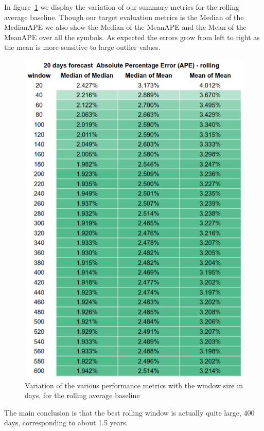 \documentclass[10pt]{article}
\begin{document}
In figure~{\ref{920430}} we display the variation of
our summary metrics for the rolling average baseline. Though our target
evaluation metrics is the Median of the MedianAPE we also show the
Median of the MeanAPE and the Mean of the MeanAPE over all the symbols.
As expected the errors grow from left to right as the mean is more
sensitive to large outlier values.
\begin{figure}[H]
\begin{center}
\includegraphics[width=0.70\columnwidth]{figures/screenshot5/screenshot5}
\caption{{Variation of the various performance metrics with the window size in
days, for the rolling average baseline
{\label{920430}}%
}}
\end{center}
\end{figure}

The main conclusion is that the best rolling window is actually quite
large, 400 days, corresponding to about 1.5 years.~
\end{document}
